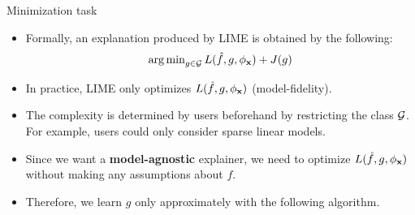 \documentclass[11pt,compress,t,notes=noshow, xcolor=table]{beamer}
\begin{document}
\begin{vbframe}{Minimization task}
	\begin{itemize}
		\item Formally, an explanation produced by LIME is obtained by the following: 
		$$ \argmin_{g \in \Gspace} L(\fh, g, \neigh) + J(g)$$
		\item In practice, LIME only optimizes $L(\fh, g, \neigh)$ (model-fidelity). 	
		\item The complexity is determined by users beforehand by restricting the class $\Gspace$. For example, users could only consider sparse linear models. 
		\item Since we want a \textbf{model-agnostic} explainer, we need to optimize $L(\fh, g, \neigh)$ without making any assumptions about $f$. 
		\item Therefore, we learn $g$ only approximately with the following algorithm.  
		\end{itemize}
\end{vbframe} 
\end{document}
